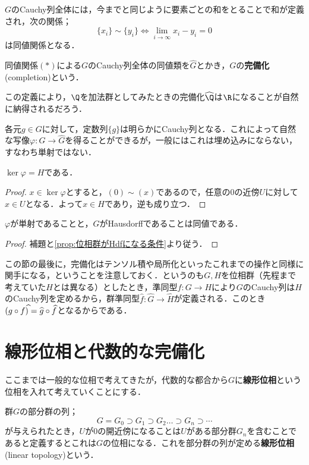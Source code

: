 $G$のCauchy列全体には，今までと同じように要素ごとの和をとることで和が定義され，次の関係；
\[\{x_i\}\sim\{y_i\}\Longleftrightarrow \lim_{i\to\infty} x_i-y_i= 0\tag{$\ast$}\]
は同値関係となる．

\begin{defi}[完備化]
	同値関係$(\ast)$による$G$のCauchy列全体の同値類を$\widehat G$とかき，$G$の\textbf{完備化}(completion)という．
\end{defi}

この定義により，$\Q$を加法群としてみたときの完備化$\widehat{\Q}$は$\R$になることが自然に納得されるだろう．

各元$g\in G$に対して，定数列$\{g\}$は明らかにCauchy列となる．これによって自然な写像$\varphi:G\to\widehat{G}$を得ることができるが，一般にはこれは埋め込みにならない，すなわち単射ではない．

\begin{lem}
	$\ker\varphi=H$である．
\end{lem}

\begin{proof}
	$x\in\ker\varphi$とすると，$(0)\sim(x)$であるので，任意の$0$の近傍$U$に対して$x\in U$となる．よって$x\in H$であり，逆も成り立つ．
\end{proof}

\begin{prop}
	$\varphi$が単射であることと，$G$がHausdorffであることは同値である．
\end{prop}

\begin{proof}
	補題と\ref{prop:位相群がHdfになる条件}より従う．
\end{proof}

この節の最後に，完備化はテンソル積や局所化といったこれまでの操作と同様に関手になる，ということを注意しておく．というのも$G,H$を位相群（先程まで考えていた$H$とは異なる）としたとき，準同型$f:G\to H$により$G$のCauchy列は$H$のCauchy列を定めるから，群準同型$\widehat{f}:\widehat{G}\to\widehat{H}$が定義される．このとき$(g\circ f)\widehat{\mathstrut}=\widehat{g}\circ\widehat{f}$となるからである．
\section{線形位相と代数的な完備化}

ここまでは一般的な位相で考えてきたが，代数的な都合から$G$に\textbf{線形位相}という位相を入れて考えていくことにする．

\begin{defi}[線形位相]
	群$G$の部分群の列；
	\[G=G_0\supset G_1\supset G_2\dots\supset G_n\supset\cdots\]
	が与えられたとき，$U$が$0$の開近傍になることは$U$がある部分群$G_n$を含むことであると定義するとこれは$G$の位相になる．これを部分群の列が定める\textbf{線形位相}(linear topology)という．
\end{defi}

